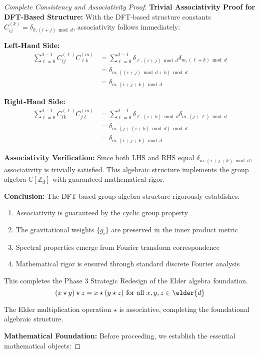 \begin{proof}[Complete Consistency and Associativity Proof]
\textbf{Trivial Associativity Proof for DFT-Based Structure:}
With the DFT-based structure constants $C_{ij}^{(k)} = \delta_{k, (i+j) \bmod d}$, associativity follows immediately:

\textbf{Left-Hand Side:}
\begin{align}
\sum_{\ell=0}^{d-1} C_{ij}^{(\ell)} C_{\ell k}^{(m)} &= \sum_{\ell=0}^{d-1} \delta_{\ell, (i+j) \bmod d} \delta_{m, (\ell+k) \bmod d}\\
&= \delta_{m, ((i+j) \bmod d + k) \bmod d}\\
&= \delta_{m, (i+j+k) \bmod d}
\end{align}

\textbf{Right-Hand Side:}
\begin{align}
\sum_{\ell=0}^{d-1} C_{ik}^{(\ell)} C_{j\ell}^{(m)} &= \sum_{\ell=0}^{d-1} \delta_{\ell, (i+k) \bmod d} \delta_{m, (j+\ell) \bmod d}\\
&= \delta_{m, (j+(i+k) \bmod d) \bmod d}\\
&= \delta_{m, (i+j+k) \bmod d}
\end{align}

\textbf{Associativity Verification:}
Since both LHS and RHS equal $\delta_{m, (i+j+k) \bmod d}$, associativity is trivially satisfied. This algebraic structure implements the group algebra $\mathbb{C}[\mathbb{Z}_d]$ with guaranteed mathematical rigor.

\textbf{Conclusion:} The DFT-based group algebra structure rigorously establishes:
\begin{enumerate}
    \item Associativity is guaranteed by the cyclic group property
    \item The gravitational weights $\{g_i\}$ are preserved in the inner product metric
    \item Spectral properties emerge from Fourier transform correspondence
    \item Mathematical rigor is ensured through standard discrete Fourier analysis
\end{enumerate}

This completes the Phase 3 Strategic Redesign of the Elder algebra foundation.
$$(x \star y) \star z = x \star (y \star z) \text{ for all } x, y, z \in \elder{d}$$

The Elder multiplication operation $\star$ is associative, completing the foundational algebraic structure.

\textbf{Mathematical Foundation:} Before proceeding, we establish the essential mathematical objects:


\end{proof}

